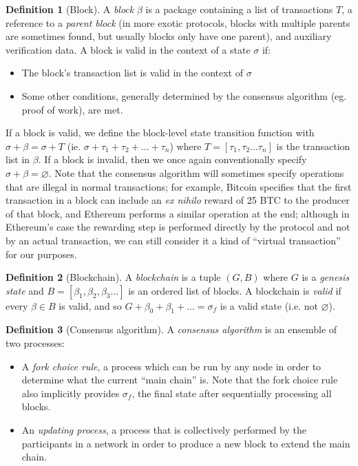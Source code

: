 \documentclass[11pt,a4paper]{article}
\makeatletter
\theoremstyle{plain}
\theoremstyle{definition}
\newtheorem{defn}{Definition}[section]
\theoremstyle{remark}
\newcommand{\ie}{i.e.\@\xspace}
\makeatother
\begin{document}
\begin{defn}[Block]
A \emph{block} $\beta$ is a package containing a list of transactions $T$, a reference to a \emph{parent block} (in more exotic protocols, blocks with multiple parents are sometimes found, but usually blocks only have one parent), and auxiliary verification data. A block is valid in the context of a state $\sigma$ if:
\begin{itemize}
\item
The block's transaction list is valid in the context of $\sigma$
\item
Some other conditions, generally determined by the consensus algorithm (eg. proof of work), are met.
\end{itemize}
If a block is valid, we define the block-level state transition function with $\sigma + \beta = \sigma + T$ (ie. $\sigma + \tau_1 + \tau_2 + ... + \tau_n$) where $T = [\tau_1, \tau_2 ... \tau_n]$ is the transaction list in $\beta$. If a block is invalid, then we once again conventionally specify $\sigma + \beta = \varnothing$. Note that the consensus algorithm will sometimes specify operations that are illegal in normal transactions; for example, Bitcoin specifies that the first transaction in a block can include an \emph{ex nihilo} reward of 25 BTC to the producer of that block, and Ethereum performs a similar operation at the end; although in Ethereum's case the rewarding step is performed directly by the protocol and not by an actual transaction, we can still consider it a kind of ``virtual transaction'' for our purposes.
\end{defn}

\begin{defn}[Blockchain]
A \emph{blockchain} is a tuple $(G, B)$ where $G$ is a \emph{genesis state} and $B = [\beta_1, \beta_2, \beta_3 ...]$ is an ordered list of blocks. A blockchain is \emph{valid} if every $\beta \in B$ is valid, and so $G + \beta_0 + \beta_1 + ... = \sigma_f$ is a valid state (\ie not $\varnothing$).
\end{defn}

\begin{defn}[Consensus algorithm]
A \emph{consensus algorithm} is an ensemble of two processes:
\begin{itemize}
\item
A \emph{fork choice rule}, a process which can be run by any node in order to determine what the current ``main chain'' is. Note that the fork choice rule also implicitly provides $\sigma_f$, the final state after sequentially processing all blocks.
\item
An \emph{updating process}, a process that is collectively performed by the participants in a network in order to produce a new block to extend the main chain.
\end{itemize}
\end{defn}
\end{document}
